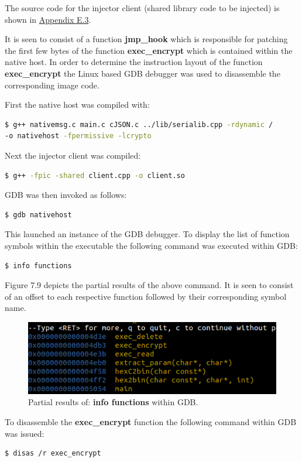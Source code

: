 The source code for the injector client (shared library code to be injected) is shown in \hyperref[sec:exp3]{Appendix E.3}.

It is seen to consist of a function \textbf{jmp\_hook} which is responsible for patching the first few bytes of the function \textbf{exec\_encrypt} which is contained within the native host. In order to determine the instruction layout of the function \textbf{exec\_encrypt} the Linux based GDB debugger was used to disassemble the corresponding image code. 

First the native host was compiled with:
\begin{lstlisting}[language=bash, frame=none]
$ g++ nativemsg.c main.c cJSON.c ../lib/serialib.cpp -rdynamic /
-o nativehost -fpermissive -lcrypto
\end{lstlisting}

Next the injector client was compiled:
\begin{lstlisting}[language=bash, frame=none]
$ g++ -fpic -shared client.cpp -o client.so
\end{lstlisting}

GDB was then invoked as follows:
\begin{lstlisting}[language=bash, frame=none]
$ gdb nativehost
\end{lstlisting}

This launched an instance of the GDB debugger. To display the list of function symbols within the executable the following command was executed within GDB:

\begin{lstlisting}[language=bash, frame=none]
$ info functions
\end{lstlisting}

Figure 7.9 depicts the partial results of the above command. It is seen to consist of an offset to each respective function followed by their corresponding symbol name.
\begin{figure}[H]
\centering
\includegraphics[width=0.7\columnwidth]{Figures/Fig_36.png}
\caption{Partial results of: \textbf{info functions} within GDB.}
\label{fig:gantt}
\end{figure}

To disassemble the \textbf{exec\_encrypt} function the following command within GDB was issued:
\begin{lstlisting}[language=bash, frame=none]
$ disas /r exec_encrypt
\end{lstlisting}

